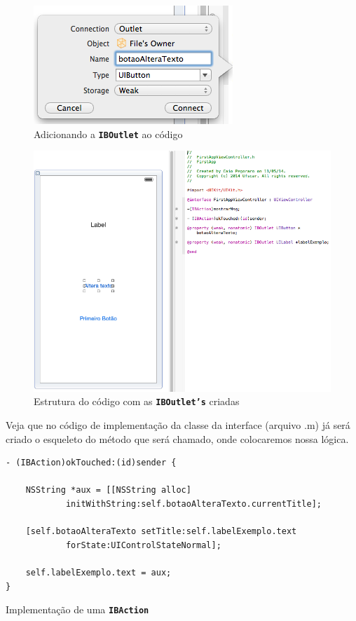\documentclass[a4paper,12pt,brazil,doubleside]{book}
\begin{document}
\begin{singlespace}
\begin{figure}[H]
  \centering
  \includegraphics[width=.45\textwidth]{figuras/3/tela_novo_projeto_29.png}
  \caption{Adicionando a \texttt{\textbf{IBOutlet}} ao código}
  \label{fig:a}
\end{figure}

\begin{figure}[H]
  \centering
  \includegraphics[width=.75\textwidth]{figuras/3/tela_novo_projeto_30.png}
  \caption{Estrutura do código com as \texttt{\textbf{IBOutlet's}} criadas}
  \label{fig:a}
\end{figure}


Veja que no código de implementação da classe da interface (arquivo .m) já será criado o esqueleto do método que será chamado, onde colocaremos nossa lógica.

\begin{listing}[H]
\begin{verbatim}
- (IBAction)okTouched:(id)sender {
    
    NSString *aux = [[NSString alloc] 
    		initWithString:self.botaoAlteraTexto.currentTitle];
    
    [self.botaoAlteraTexto setTitle:self.labelExemplo.text 
    		forState:UIControlStateNormal];
    
    self.labelExemplo.text = aux;
}
\end{verbatim}
\caption{Implementação de uma \texttt{\textbf{IBAction}}}
\end{listing}



\end{singlespace}
\end{document}
